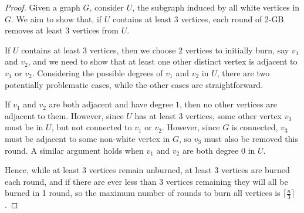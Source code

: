 \documentclass{mpaper}
\begin{document}
\begin{proof}
  Given a graph $G$, consider $U$, the subgraph induced by all white vertices in $G$. We aim to show that, if $U$ contains at least $3$ vertices, each round of 2-GB removes at least $3$ vertices from $U$.

  If $U$ contains at least $3$ vertices, then we choose $2$ vertices to initially burn, say $v_1$ and $v_2$, and we need to show that at least one other distinct vertex is adjacent to $v_1$ or $v_2$. Considering the possible degrees of $v_1$ and $v_2$ in $U$, there are two potentially problematic cases, while the other cases are straightforward.

  If $v_1$ and $v_2$ are both adjacent and have degree $1$, then no other vertices are adjacent to them. However, since $U$ has at least $3$ vertices, some other vertex $v_3$ must be in $U$, but not connected to $v_1$ or $v_2$. However, since $G$ is connected, $v_3$ must be adjacent to some non-white vertex in $G$, so $v_3$ must also be removed this round. A similar argument holds when $v_1$ and $v_2$ are both degree $0$ in $U$.
  
  




  Hence, while at least $3$ vertices remain unburned, at least $3$ vertices are burned each round, and if there are ever less than $3$ vertices remaining they will all be burned in 1 round, so the maximum number of rounds to burn all vertices is $\lceil \frac{n}{3} \rceil$.
  
\end{proof}
\end{document}
